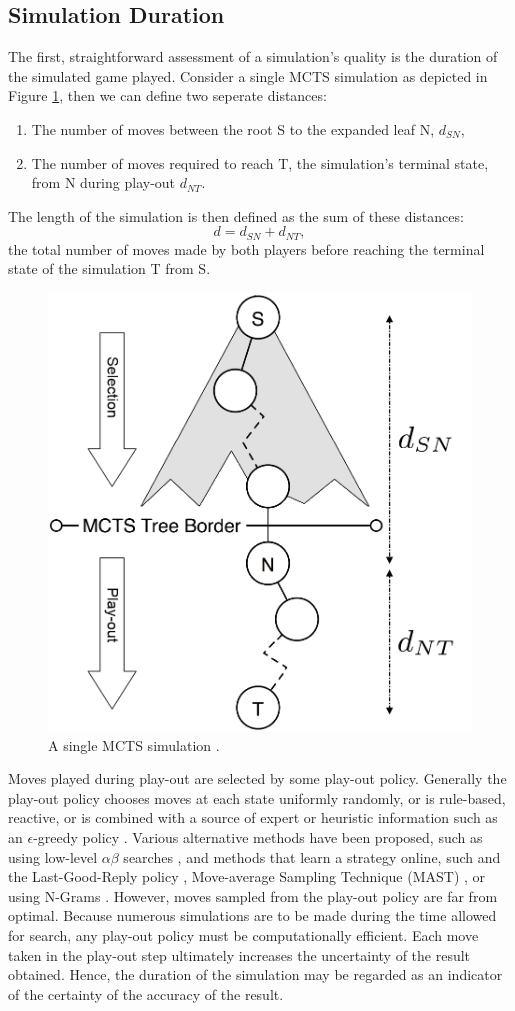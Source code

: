 \documentclass{ecai2014}
\newcommand{\node}[1]{{\fontfamily{phv}\selectfont#1}}
\begin{document}
\subsection{Simulation Duration} 
\label{sub:simdur}
The first, straightforward assessment of a simulation's quality is the duration of the simulated game played. Consider a single MCTS simulation as depicted in Figure \ref{fig:mcts-simulation}, then we can define two seperate distances: 
\begin{enumerate}
\item The number of moves between the root \node{S} to the expanded leaf \node{N}, $d_{SN}$,
\item The number of moves required to reach \node{T}, the simulation's terminal state, from \node{N} during play-out $d_{NT}$.
\end{enumerate}
The length of the simulation is then defined as the sum of these distances:
\begin{equation}
d = d_{SN} + d_{NT},
\label{eq:m_ST}
\end{equation}
the total number of moves made by both players before reaching the terminal state of the simulation \node{T} from \node{S}.
\begin{figure}[t]
	\centering
	\includegraphics[width=.3\textwidth]{img/figure2_new.png}
	\caption{A single MCTS simulation \cite{finnsson2010learning}.}
	\label{fig:mcts-simulation}
\end{figure}
Moves played during play-out are selected by some play-out policy. Generally the play-out policy chooses moves at each state uniformly randomly, or is rule-based, reactive, or is combined with a source of expert or heuristic information such as an $\epsilon$-greedy policy \cite{sturtevant2008analysis, sutton1998reinforcement}. Various alternative methods have been proposed, such as using low-level $\alpha\beta$ searches \cite{Winands2011}, and methods that learn a strategy online, such and the Last-Good-Reply policy \cite{baier2010power}, Move-average Sampling Technique (MAST) \cite{finnsson2008simulation}, or using N-Grams \cite{Tak2012}. However, moves sampled from the play-out policy are far from optimal. Because numerous simulations are to be made during the time allowed for search, any play-out policy must be computationally efficient. Each move taken in the play-out step ultimately increases the uncertainty of the result obtained. Hence, the duration of the simulation may be regarded as an indicator of the certainty of the accuracy of the result.
\end{document}
